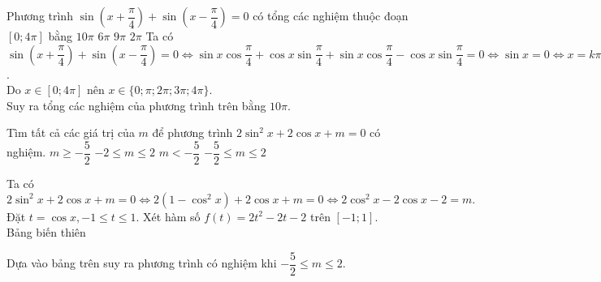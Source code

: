 \begin{ex}%
	Phương trình $\sin \left(x+\dfrac{\pi}{4}\right)+\sin \left(x-\dfrac{\pi}{4}\right) =0$ có tổng các nghiệm thuộc đoạn $[0;4\pi]$ bằng
	\choice
	{\True $10\pi$}
	{$6\pi$}
	{$9\pi$}
	{$2\pi$}
	\loigiai
	{ 
		Ta có $\sin \left(x+\dfrac{\pi}{4}\right)+\sin \left(x-\dfrac{\pi}{4}\right) =0 \Leftrightarrow \sin x \cos {\dfrac{\pi}{4}} + \cos x \sin {\dfrac{\pi}{4}} + \sin x \cos {\dfrac{\pi}{4}} - \cos x \sin {\dfrac{\pi}{4}}=0 \Leftrightarrow \sin x =0 \Leftrightarrow x= k\pi; k \in \mathbb{Z}$.\\
		Do $x \in [0;4\pi]$ nên $x \in \{0; \pi; 2\pi; 3\pi; 4\pi \}.$\\
		Suy ra tổng các nghiệm của phương trình trên bằng $10\pi$.}
\end{ex}
\begin{ex}%
	Tìm tất cả các giá trị của $m$ để phương trình $2\sin^2 x+2\cos x+m=0$ có nghiệm.
	\choice
	{$m \geq -\dfrac{5}{2}$}
	{$-2 \leq m \leq 2$}
	{$m<-\dfrac{5}{2}$}
	{\True $-\dfrac{5}{2}\leq m \leq2$}
	\loigiai
	{ 
		Ta có $2\sin^2 x+2\cos x+m=0 \Leftrightarrow 2\left(1-\cos^2 x \right) +2\cos x+m=0 \Leftrightarrow 2\cos^2  x - 2\cos x -2=m.$\\
		Đặt $t=\cos x, -1 \leq t \leq 1$. Xét hàm số $f(t) = 2t^2 - 2t - 2 $ trên  $[-1;1]$.\\
		Bảng biến thiên 
		\begin{center}
		\end{center}
		Dựa vào bảng trên suy ra phương trình có nghiệm khi $-\dfrac{5}{2}\leq m \leq2$.}
\end{ex}


